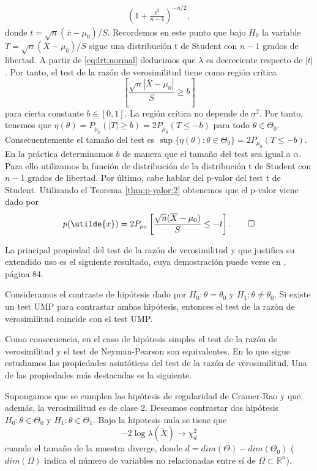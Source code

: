 \begin{ex}
\begin{equation}
\begin{split}
            \left(1 + \frac{t^2}{n-1}\right)^{-n/2},
            \end{split}
            \end{equation}
            donde $t = \sqrt{n}(\overline{x} - \mu_0) / S$. Recordemos en este punto que bajo $H_0$ la variable $T = \sqrt{n}(\overline{X} - \mu_0) / S$ sigue una distribución t de Student con $n-1$ grados de libertad. A partir de \eqref{eq:lrt:normal} deducimos que $\lambda$ es decreciente respecto de $|t|$. Por tanto, el test de la razón de verosimilitud tiene como región crítica
            \[\left[\frac{\sqrt{n}|\overline{X} - \mu_0|}{S} \ge b\right]\]
            para cierta constante $b \in [0,1]$. La región crítica no depende de $\sigma^2$. Por tanto, tenemos que $\eta(\theta) = P_{\mu_0}(|T| \ge b) = 2 P_{\mu_0}(T \le -b)$ para todo $\theta \in \Theta_0$. Consecuentemente el tamaño del test es $\sup\{\eta(\theta): \theta \in \Theta_0\} = 2P_{\mu_0}(T \le -b)$. En la práctica determinamos $b$ de manera que el tamaño del test sea igual a $\alpha$. Para ello utilizamos la función de distribución de la distribución t de Student con $n-1$ grados de libertad.
            Por último, cabe hablar del p-valor del test t de Student. Utilizando el Teorema \ref{thm:p-valor:2} obtenemos que el p-valor viene dado por
            \[p(\utilde{x}) = 2P_{\mu_0}\left[\frac{\sqrt{n}(\overline{X} - \mu_0)}{S} \le -t\right]. \qedhere\]
        \end{ex}

        La principal propiedad del test de la razón de verosimilitud y que justifica su extendido uso es el siguiente resultado, cuya demostración puede verse en \cite{garthwaite}, página 84.

        \begin{thm}
            Consideramos el contraste de hipótesis dado por $H_0: \theta = \theta_0$ y $H_1: \theta \ne \theta_0$. Si existe un test UMP para contrastar ambas hipótesis, entonces el test de la razón de verosimilitud coincide con el test UMP.
        \end{thm}

        Como consecuencia, en el caso de hipótesis simples el test de la razón de verosimilitud y el test de Neyman-Pearson son equivalentes. En lo que sigue estudiamos las propiedades asintóticas del test de la razón de verosimilitud. Una de las propiedades más destacadas es la siguiente.

        \begin{thm}
            Supongamos que se cumplen las hipótesis de regularidad de Cramer-Rao y que, además, la verosimilitud es de clase 2. Deseamos contrastar dos hipótesis $H_0: \theta \in \Theta_0$ y $H_1: \theta \in \Theta_1$. Bajo la hipotesis nula se tiene que
            \[-2 \log \lambda(\utilde{X}) \to \chi_d^2\]
            cuando el tamaño de la muestra diverge, donde $d = dim(\Theta) - dim(\Theta_0)$ ($dim(\Omega)$ indica el número de variables no relacionadas entre sí de $\Omega \subset \mathbb{R}^n$).
        \end{thm}

